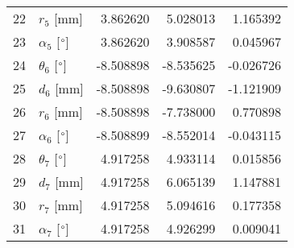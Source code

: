\documentclass{standalone}%
\begin{document}
\begin{tabular}{llrrr}
22 &              $r_{5}$ [mm] &  3.862620 &   5.028013 &   1.165392 \\
23 &  $\alpha_{5}$ [$\degree$] &  3.862620 &   3.908587 &   0.045967 \\
24 &  $\theta_{6}$ [$\degree$] & -8.508898 &  -8.535625 &  -0.026726 \\
25 &              $d_{6}$ [mm] & -8.508898 &  -9.630807 &  -1.121909 \\
26 &              $r_{6}$ [mm] & -8.508898 &  -7.738000 &   0.770898 \\
27 &  $\alpha_{6}$ [$\degree$] & -8.508899 &  -8.552014 &  -0.043115 \\
28 &  $\theta_{7}$ [$\degree$] &  4.917258 &   4.933114 &   0.015856 \\
29 &              $d_{7}$ [mm] &  4.917258 &   6.065139 &   1.147881 \\
30 &              $r_{7}$ [mm] &  4.917258 &   5.094616 &   0.177358 \\
31 &  $\alpha_{7}$ [$\degree$] &  4.917258 &   4.926299 &   0.009041 \\
\bottomrule
\end{tabular}
%
\end{document}
